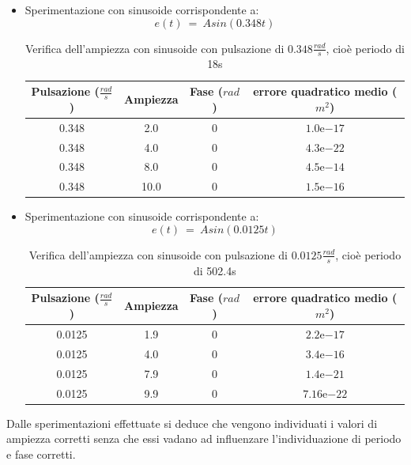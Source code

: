 \documentclass[a4paper,12pt]{report}
\newcommand{\expnumber}[2]{{#1}\mathrm{e}{#2}}
\begin{document}
\begin{itemize}
  \item Sperimentazione con sinusoide corrispondente a:
  \begin{equation}
    e(t)~=~Asin(0.348t)
  \end{equation}


  \begin{table}[H]
    \caption{Verifica dell'ampiezza con sinusoide con pulsazione di $0.348\frac{rad}{s}$, cioè periodo di 18s}
    \center
      \begin{tabular}{SSSS}
        \toprule
        {Pulsazione ($\frac{rad}{s}$)} & {Ampiezza} & {Fase ($rad$)} & {errore quadratico medio ($m^2$)} \\
         & 2.0 & 0 & $\expnumber{1.0}{-17}$ \\
         0.348 & 4.0 & 0 & $\expnumber{4.3}{-22}$ \\
         0.348 & 8.0 & 0 & $\expnumber{4.5}{-14}$ \\
         0.348 & 10.0 & 0 & $\expnumber{1.5}{-16}$ \\
        \bottomrule
      \end{tabular}
  \end{table}

  \item Sperimentazione con sinusoide corrispondente a:
  \begin{equation}
    e(t)~=~Asin(0.0125t)
  \end{equation}
  \begin{table}[H]
    \caption{Verifica dell'ampiezza con sinusoide con pulsazione di $0.0125\frac{rad}{s}$, cioè periodo di 502.4s }
    \center
      \begin{tabular}{SSSS}
        \toprule
        {Pulsazione ($\frac{rad}{s}$)} & {Ampiezza} & {Fase ($rad$)} & {errore quadratico medio ($m^2$)} \\
         & 1.9 & 0 & $\expnumber{2.2}{-17}$ \\
         0.0125 & 4.0 & 0 & $\expnumber{3.4}{-16}$ \\
         0.0125 & 7.9 & 0 & $\expnumber{1.4}{-21}$ \\
         0.0125 & 9.9 & 0 & $\expnumber{7.16}{-22}$ \\
        \bottomrule
      \end{tabular}
  \end{table}
\end{itemize}

Dalle sperimentazioni effettuate si deduce che vengono individuati i valori di ampiezza corretti senza che essi vadano ad influenzare l'individuazione di periodo e fase corretti.
\end{document}

